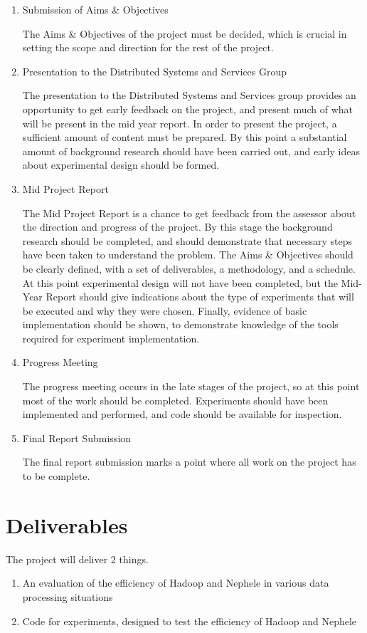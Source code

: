 \begin{enumerate}
	\item Submission of Aims \& Objectives

	The Aims \& Objectives of the project must be decided, which is crucial in setting the scope and direction for the rest of the project.

	\item Presentation to the Distributed Systems and Services Group

	The presentation to the Distributed Systems and Services group provides an opportunity to get early feedback on the project, and present much of what will be present in the mid year report. In order to present the project, a sufficient amount of content must be prepared. By this point a substantial amount of background research should have been carried out, and early ideas about experimental design should be formed.

	\item Mid Project Report

	The Mid Project Report is a chance to get feedback from the assessor about the direction and progress of the project. By this stage the background research should be completed, and should demonstrate that necessary steps have been taken to understand the problem. The Aims \& Objectives should be clearly defined, with a set of deliverables, a methodology, and a schedule. At this point experimental design will not have been completed, but the Mid-Year Report should give indications about the type of experiments that will be executed and why they were chosen. Finally, evidence of basic implementation should be shown, to demonstrate knowledge of the tools required for experiment implementation. 

	\item Progress Meeting

	The progress meeting occurs in the late stages of the project, so at this point most of the work should be completed. Experiments should have been implemented and performed, and code should be available for inspection.

	\item Final Report Submission
	
	The final report submission marks a point where all work on the project has to be complete. 
\end{enumerate}

\section{Deliverables}
The project will deliver 2 things.

\begin{enumerate}
	\item An evaluation of the efficiency of Hadoop and Nephele in various data processing situations
	\item Code for experiments, designed to test the efficiency of Hadoop and Nephele
\end{enumerate}